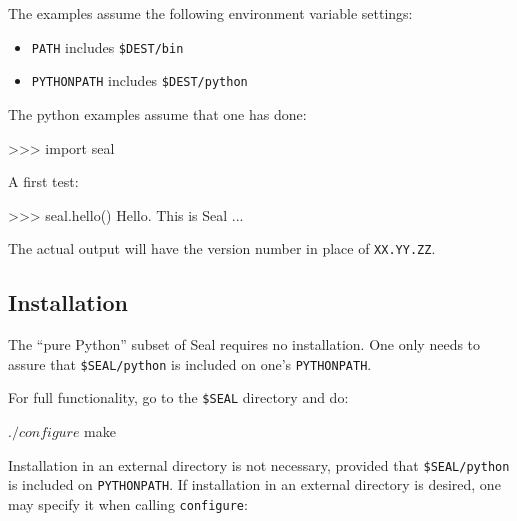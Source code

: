 
The examples assume the following environment variable settings:
\begin{itemize}
\item {\tt PATH} includes {\tt \$DEST/bin}
\item {\tt PYTHONPATH} includes {\tt \$DEST/python}
\end{itemize}
The python examples assume that one has done:
\begin{python}
>>> import seal
\end{python}
A first test:
\begin{python}
>>> seal.hello()
Hello.  This is Seal ...
\end{python}
The actual output will have the version number in place of {\tt XX.YY.ZZ}.

\subsection{Installation}

The ``pure Python'' subset of Seal requires no installation.  One only
needs to assure that {\tt \$SEAL/python} is included on one's
{\tt PYTHONPATH}.

For full functionality, go to the {\tt \$SEAL} directory and do:
\begin{myverb}
$ ./configure
$ make
\end{myverb}
Installation in an external directory is not necessary, provided that
{\tt \$SEAL/python} is included on {\tt PYTHONPATH}.  If installation
in an external directory is desired, one may specify it when calling
{\tt configure}:
